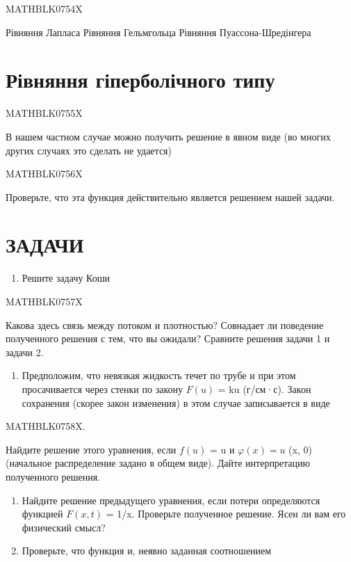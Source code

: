 \documentclass[
]{article}
\providecommand{\tightlist}{%
  \setlength{\itemsep}{0pt}\setlength{\parskip}{0pt}}
\begin{document}
MATHBLK0754X

Рівняння Лапласа Рівняння Гельмгольца Рівняння Пуассона-Шредінгера

\section{Рівняння гіперболічного
типу}\label{ux440ux456ux432ux43dux44fux43dux43dux44f-ux433ux456ux43fux435ux440ux431ux43eux43bux456ux447ux43dux43eux433ux43e-ux442ux438ux43fux443}

MATHBLK0755X

В нашем частном случае можно получить решение в явном виде (во многих
других случаях это сделать не удается)

MATHBLK0756X

Проверьте, что эта функция действительно является решением нашей задачи.

\section{\texorpdfstring{\textbf{ЗАДАЧИ}}{ЗАДАЧИ}}\label{ux437ux430ux434ux430ux447ux438-9}

\begin{enumerate}
\def\labelenumi{\arabic{enumi}.}
\tightlist
\item
  Решите задачу Коши
\end{enumerate}

MATHBLK0757X

Какова здесь связь между потоком и плотностью? Совнадает ли поведение
полученного решения с тем, что вы ожидали? Сравните решения задачи 1 и
задачи 2.

\begin{enumerate}
\def\labelenumi{\arabic{enumi}.}
\setcounter{enumi}{2}
\tightlist
\item
  Предположим, что невязкая жидкость течет по трубе и при этом
  просачивается через стенки по закону \(F(u)\) = ku (г/см·с). Закон
  сохранения (скорее закон изменения) в этом случае записывается в виде
\end{enumerate}

MATHBLK0758X.

Найдите решение этого уравнения, если \(f(u)\) = u и \(\varphi(x) = u\)
(x, 0) (начальное распределение задано в общем виде). Дайте
интерпретацию полученного решения.

\begin{enumerate}
\def\labelenumi{\arabic{enumi}.}
\setcounter{enumi}{3}
\item
  Найдите решение предыдущего уравнения, если потери определяются
  функцией \(F(x, t)\) = 1/x. Проверьте полученное решение. Ясен ли вам
  его физический смысл?
\item
  Проверьте, что функция и, неявно заданная соотношением
\end{enumerate}
\end{document}
